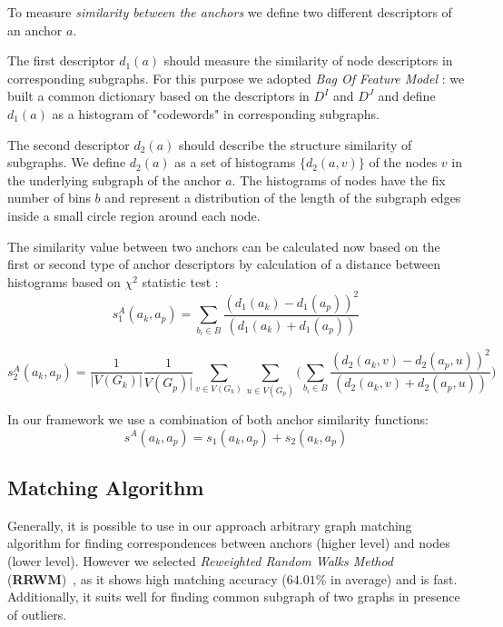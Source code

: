 To measure \emph{similarity between the anchors} we  define two different descriptors of an anchor $a$.

The first descriptor $d_1(a)$ should measure the similarity of node descriptors in corresponding subgraphs. For this purpose we adopted \emph{Bag Of Feature Model} : we built a common dictionary based on the descriptors in $D^I$ and $D^J$ and define $d_1(a)$ as a histogram of "codewords" in corresponding subgraphs.

The second descriptor $d_2(a)$ should describe the structure similarity of subgraphs. We define $d_2(a)$ as a set of histograms $\{d_2(a,v)\}$ of the nodes $v$ in the underlying subgraph of the anchor $a$. The histograms of nodes have the fix number of bins $b$ and represent a distribution of the length of the subgraph edges inside a small circle region around each node. 

The similarity value between two anchors can be calculated now based on the first or second type of anchor descriptors by calculation of a distance between histograms based on $\chi^2$ statistic test \cite{Weken2004_ChiSqTest}:
\begin{equation}
s^A_1(a_k, a_p) = \sum_{b_i\in B}\frac{(d_1(a_k)-d_1(a_p))^2}{(d_1(a_k)+d_1(a_p))}
\end{equation}

\begin{equation}
s^A_2(a_k, a_p) = \frac{1}{|V(G_k)|}\frac{1}{V(G_p)|}\sum_{v\in V(G_k)}\sum_{u\in V(G_p)} \big(\sum_{b_i\in B}\frac{(d_2(a_k,v)-d_2(a_p,u))^2}{(d_2(a_k,v)+d_2(a_p,u))}\big)
\end{equation}

In our framework we use a combination of both anchor similarity functions:
\begin{equation}
s^A(a_k, a_p) = s_1(a_k, a_p)+s_2(a_k, a_p) 
\end{equation}


\subsection{Matching Algorithm}

Generally, it is possible to use in our approach arbitrary graph matching algorithm for finding correspondences between anchors (higher level) and nodes (lower level). However we selected \emph{Reweighted Random Walks Method} (\textbf{RRWM})~\cite{Cho2010_RRWM}, as it shows high matching accuracy ($64.01\%$ in average) and is fast. Additionally, it	 suits well for finding common subgraph of two graphs in presence of outliers.

